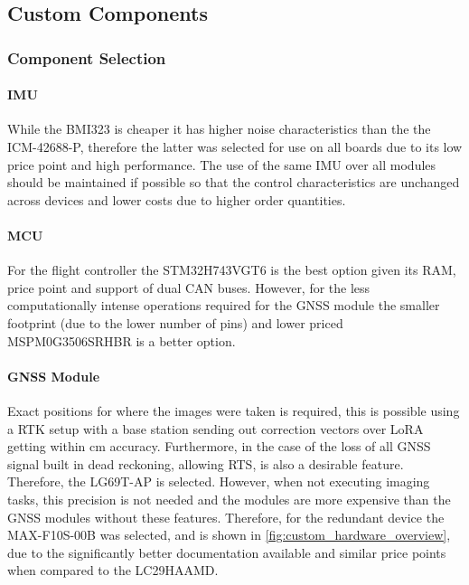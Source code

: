 \subsection{Custom Components}\label{sub_sub_section:tgt_custom_components}

\subsubsection{Component Selection}\label{sub_sub_section:tgt_component_selection}

\paragraph{\gls{IMU}}
While the BMI323 is cheaper it has higher noise characteristics than the the ICM-42688-P, therefore the latter was selected for use on all boards due to its low price point and high performance. The use of the same \gls{IMU} over all modules should be maintained if possible so that the control characteristics are unchanged across devices and lower costs due to higher order quantities.
\paragraph{\gls{MCU}}
For the flight controller the STM32H743VGT6 is the best option given its \gls{RAM}, price point and support of dual \gls{CAN} buses. However, for the less computationally intense operations required for the \gls{GNSS} module the smaller footprint (due to the lower number of pins) and lower priced MSPM0G3506SRHBR is a better option.
\paragraph{\gls{GNSS} Module}
Exact positions for where the images were taken is required, this is possible using a \gls{RTK} setup with a base station sending out correction vectors over LoRA getting within cm accuracy\cite{RTK_LORA}. Furthermore, in the case of the loss of all \gls{GNSS} signal built in dead reckoning, allowing \gls{RTS}, is also a desirable feature. Therefore, the LG69T-AP is selected. However, when not executing imaging tasks, this precision is not needed and the modules are more expensive than the \gls{GNSS} modules without these features. Therefore, for the redundant device the MAX-F10S-00B was selected, and is shown in \ref{fig:custom_hardware_overview}, due to the significantly better documentation available and similar price points when compared to the LC29HAAMD.

